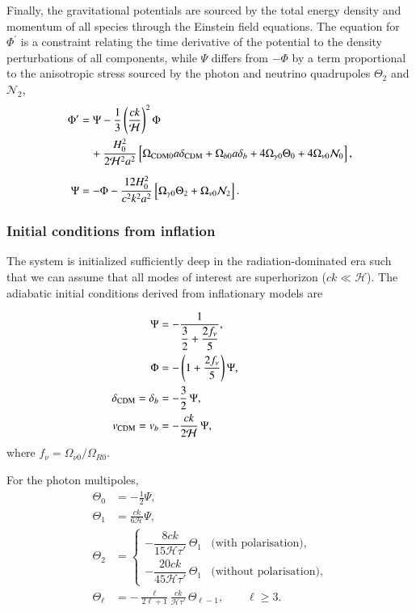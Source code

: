 \documentclass[twocolumn]{aa}
\begin{document}
Finally, the gravitational potentials are sourced by the total energy density and momentum of all species through the Einstein field equations. The equation for $\Phi^\prime$ is a constraint relating the time derivative of the potential to the density perturbations of all components, while $\Psi$ differs from $-\Phi$ by a term proportional to the anisotropic stress sourced by the photon and neutrino quadrupoles $\Theta_2$ and $\mathcal{N}_2$,
\begin{align}
\Phi^\prime &= \Psi - \frac{1}{3}\left(\frac{ck}{\mathcal{H}}\right)^2 \Phi \nonumber\\
&\quad+ \frac{H_0^2}{2\mathcal{H}^2 a^2}\left[\Omega_{\rm CDM 0} a\delta_{\rm CDM} + \Omega_{b 0} a\delta_b + 4\Omega_{\gamma 0} \Theta_0 + 4\Omega_{\nu 0}\mathcal{N}_0\right],\nonumber \\[2mm]
\Psi &= -\Phi - \frac{12H_0^2}{c^2k^2a^2}\left[\Omega_{\gamma 0}\Theta_2 + \Omega_{\nu 0}\mathcal{N}_2\right].\label{eq:Psi}
\end{align}

\subsubsection{Initial conditions from inflation}
The system is initialized sufficiently deep in the radiation-dominated era such that we can assume that all modes of interest are superhorizon ($ck \ll \mathcal{H}$). The adiabatic initial conditions derived from inflationary models are

\begin{align*}
\Psi &= -\frac{1}{\dfrac{3}{2} + \dfrac{2f_\nu}{5}}, \\
\Phi &= -\left(1+\frac{2f_\nu}{5}\right)\Psi, \\
\delta_{\rm CDM} = \delta_b &= -\frac{3}{2}\,\Psi, \\
v_{\rm CDM} = v_b &= -\frac{ck}{2\mathcal{H}}\,\Psi,\hspace{30mm}
\end{align*}
where $f_\nu = \Omega_{\nu0}/\Omega_{R0}$.

For the photon multipoles,
\begin{align*}
\Theta_0 &= -\frac{1}{2}\Psi, \\
\Theta_1 &= \frac{ck}{6\mathcal{H}}\Psi, \\
\Theta_2 &= \begin{cases}
-\dfrac{8ck}{15\mathcal{H}\tau'}\,\Theta_1 & \text{(with polarisation),} \\[6pt]
-\dfrac{20ck}{45\mathcal{H}\tau'}\,\Theta_1 & \text{(without polarisation),}
\end{cases}\\
\Theta_\ell &= -\frac{\ell}{2\ell+1}\frac{ck}{\mathcal{H}\tau'}\,\Theta_{\ell-1}, \qquad \ell \geq 3.
\end{align*}
\end{document}
